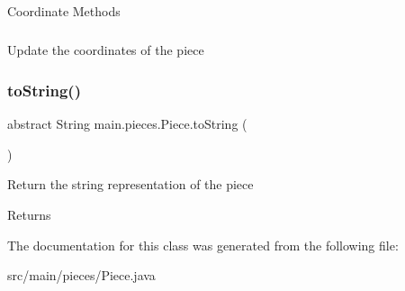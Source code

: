 \subparagraph*{}

Coordinate Methods \subparagraph*{}

Update the coordinates of the piece \hypertarget{classmain_1_1pieces_1_1_piece_a528845eb51d394c21fd0f3d8a8011696}{}\label{classmain_1_1pieces_1_1_piece_a528845eb51d394c21fd0f3d8a8011696} 
\subsubsection{\texorpdfstring{to\+String()}{toString()}}
{\footnotesize\ttfamily abstract String main.\+pieces.\+Piece.\+to\+String (\begin{DoxyParamCaption}{ }\end{DoxyParamCaption})\hspace{0.3cm}{\ttfamily [abstract]}}

Return the string representation of the piece \begin{DoxyReturn}{Returns}

\end{DoxyReturn}


The documentation for this class was generated from the following file\+:\begin{DoxyCompactItemize}
\item 
src/main/pieces/Piece.\+java\end{DoxyCompactItemize}

